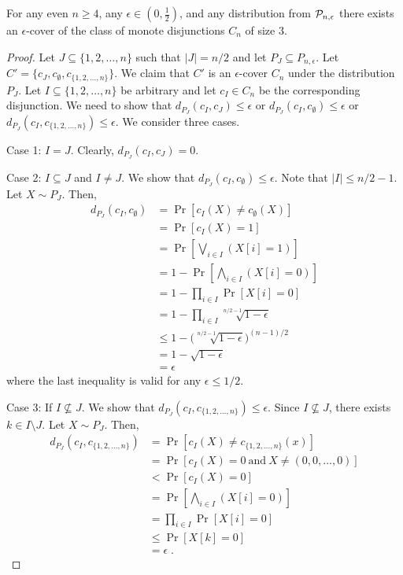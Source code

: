 \begin{lemma}
For any even $n \ge 4$, any $\epsilon \in (0,\frac{1}{2})$, and any distribution
from $\P_{n,\epsilon}$ there exists an $\epsilon$-cover of the class of monote
disjunctions $C_n$ of size $3$.
\end{lemma}

\begin{proof}
Let $J \subseteq \{1,2,\dots,n\}$ such that $|J| = n/2$ and let $P_J
\subseteq P_{n,\epsilon}$. Let $C' = \{c_J, c_\emptyset, c_{\{1,2,\dots,n\}}\}$.
We claim that $C'$ is an $\epsilon$-cover $C_n$ under the distribution $P_J$.
Let $I \subseteq \{1,2,\dots,n\}$ be arbitrary and let $c_I \in C_n$ be the
corresponding disjunction. We need to show that $d_{P_J}(c_I, c_J) \le \epsilon$
or $d_{P_J}(c_I, c_\emptyset) \le \epsilon$ or $d_{P_J}(c_I,
c_{\{1,2,\dots,n\}}) \le \epsilon$. We consider three cases.

Case 1: $I = J$. Clearly, $d_{P_J}(c_I, c_J) = 0$.

Case 2: $I \subseteq J$ and $I \neq J$. We show that $d_{P_J}(c_I, c_\emptyset) \le \epsilon$.
Note that $|I| \le n/2 - 1$. Let $X \sim P_J$. Then,
\begin{align*}
d_{P_J}(c_I, c_\emptyset)
& = \Pr[c_I(X) \neq c_\emptyset(X)] \\
& = \Pr[c_I(X) = 1] \\
& = \Pr \left[ \bigvee_{i \in I} (X[i] = 1) \right] \\
& = 1 - \Pr \left[ \bigwedge_{i \in I} (X[i] = 0) \right] \\
& = 1 - \prod_{i \in I} \Pr \left[ X[i] = 0 \right] \\
& = 1 - \prod_{i \in I} \sqrt[n/2 - 1]{1 - \epsilon} \\
& \le 1 - \bigg( \sqrt[n/2-1]{1 - \epsilon} \bigg)^{(n-1)/2} \\
& = 1 - \sqrt{1 - \epsilon} \\
& = \epsilon
\end{align*}
where the last inequality is valid for any $\epsilon \le 1/2$.

Case 3: If $I \not \subseteq J$. We show that $d_{P_J}(c_I, c_{\{1,2,\dots,n\}}) \le \epsilon$.
Since $I \not \subseteq J$, there exists $k \in I \setminus J$. Let $X \sim P_J$. Then,
\begin{align*}
d_{P_J}(c_I, c_{\{1,2,\dots,n\}})
& = \Pr [c_I(X) \neq c_{\{1,2,\dots,n\}}(x)] \\
& = \Pr [c_I(X) = 0 \ \text{and} \ X \neq (0,0,\dots,0) ] \\
& <  \Pr [c_I(X) = 0 ] \\
& = \Pr \left[ \bigwedge_{i \in I} (X[i] = 0) \right] \\
& = \prod_{i \in I} \Pr \left[ X[i] = 0 \right] \\
& \le \Pr \left[ X[k] = 0 \right] \\
& = \epsilon \; .
\end{align*}
\end{proof}

